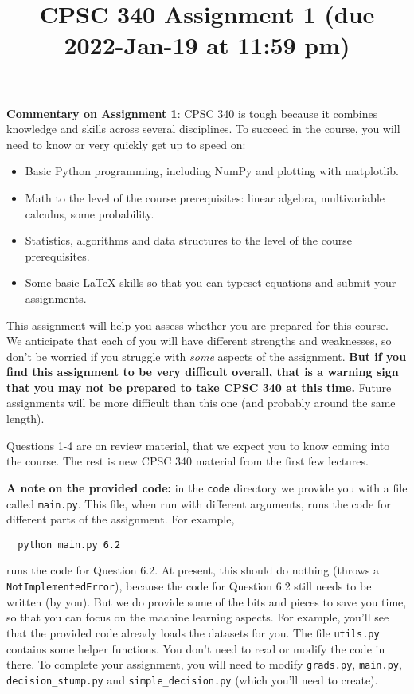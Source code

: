 \documentclass{article}
\begin{document}
  \title{CPSC 340 Assignment 1 (due 2022-Jan-19 at 11:59 pm)}

  \date{}
  \maketitle



  \textbf{Commentary on Assignment 1}: CPSC 340 is tough because it combines knowledge and skills across several disciplines. To succeed
  in the course, you will need to know or very quickly get up to speed on:
  \begin{itemize}
  \item Basic Python programming, including NumPy and plotting with matplotlib.
  \item Math to the level of the course prerequisites: linear algebra, multivariable calculus, some probability.
  \item Statistics, algorithms and data structures to the level of the course prerequisites.
  \item Some basic LaTeX skills so that you can typeset equations and submit your assignments.
  \end{itemize}

  This assignment will help you assess whether you are prepared for this course. We anticipate that each
  of you will have different strengths and weaknesses, so don't be worried if you struggle with \emph{some} aspects
  of the assignment. \textbf{But if you find this assignment
  to be very difficult overall, that is a warning sign that you may not be prepared to take CPSC 340
  at this time.} Future assignments will be more difficult than this one (and probably around the same length).

  Questions 1-4 are on review material, that we expect you to know coming into the course. The rest is new CPSC 340 material from the first few lectures.

  \textbf{A note on the provided code:} in the \texttt{code} directory we provide you with a file called
  \texttt{main.py}. This file, when run with different arguments, runs the code for different
  parts of the assignment. For example,
  \begin{verbatim}
  python main.py 6.2
  \end{verbatim}
  runs the code for Question 6.2. At present, this should do nothing (throws a \texttt{NotImplementedError}), because the code
  for Question 6.2 still needs to be written (by you). But we do provide some of the bits
  and pieces to save you time, so that you can focus on the machine learning aspects.
  For example, you'll see that the provided code already loads the datasets for you.
  The file \texttt{utils.py} contains some helper functions.
  You don't need to read or modify the code in there.
  To complete your assignment, you will need to modify \texttt{grads.py}, \texttt{main.py}, \texttt{decision\string_stump.py} and \texttt{simple\string_decision.py} (which you'll need to create).
\end{document}

